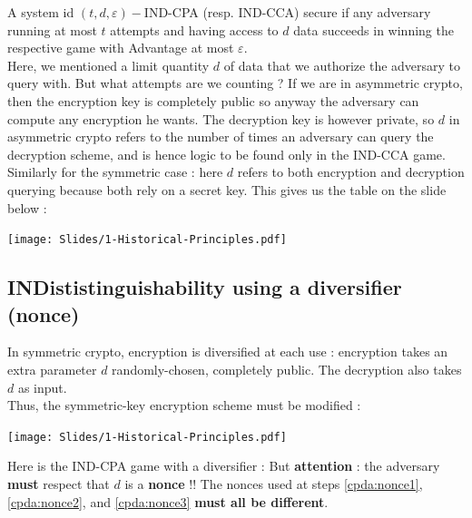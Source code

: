 \documentclass[../Cryptography.tex]{subfiles}
\begin{document}
A system id $(t,d,\varepsilon)-$IND-CPA (resp. IND-CCA) secure if any adversary running at most $t$ attempts and having access to $d$ data succeeds in winning the respective game with Advantage at most $\varepsilon$. \\

Here, we mentioned a limit quantity $d$ of data that we authorize the adversary to query with. But what attempts are we counting ? If we are in asymmetric crypto, then the encryption key is completely public so anyway the adversary can compute any encryption he wants. The decryption key is however private, so $d$ in asymmetric crypto refers to the number of times an adversary can query the decryption scheme, and is hence logic to be found only in the IND-CCA game. Similarly for the symmetric case : here $d$ refers to both encryption and decryption querying because both rely on a secret key. This gives us the table on the slide below : 

\begin{center}
    \texttt{[image: Slides/1-Historical-Principles.pdf]}
\end{center}

\subsection{INDististinguishability using a diversifier (nonce)}
In symmetric crypto, encryption is diversified at each use : encryption takes an extra parameter $d$ randomly-chosen, completely public. The decryption also takes $d$ as input. \\

Thus, the symmetric-key encryption scheme must be modified :
\begin{center}
    \texttt{[image: Slides/1-Historical-Principles.pdf]}
\end{center}

Here is the IND-CPA game with a diversifier :
But \textbf{attention} : the adversary \textbf{must} respect that $d$ is a \textbf{nonce} !! The nonces used at steps \ref{cpda:nonce1}, \ref{cpda:nonce2}, and \ref{cpda:nonce3} \textbf{must all be different}.
\end{document}
